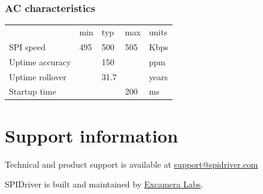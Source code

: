 \documentclass{article}
\newcommand{\heavyline}{\specialrule{1pt}{1pt}{1pt}}
\begin{document}
\subsubsection*{AC characteristics}
\vspace{10 pt}

{\renewcommand{\arraystretch}{1.2}%
\begin{tabularx}{\linewidth}{XC{40pt}C{40pt}C{40pt}C{40pt}}
\heavyline
& min & typ & max & units \\ \heavyline

SPI speed                     &495& 500 &505& Kbps   \\ \hline
Uptime accuracy               && 150 && ppm           \\ \hline
Uptime rollover               && 31.7 && years        \\ \hline
Startup time & & & 200 & ms \\ \hline
\end{tabularx}}
\vspace{10 pt}

\section{Support information}

Technical and product support is available at
\href{mailto:support@spidriver.com}{support@spidriver.com}

SPIDriver is built and maintained by
\href{https://excamera.com}{Excamera Labs}.

\newpage
\raggedright
{}
\renewcommand{\indexname}{Index}
\printindex
\end{document}
